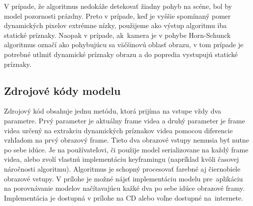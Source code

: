 V prípade, že algoritmus nedokáže detekovať žiadny pohyb na scéne, bol by model pozornosti prázdny.
Preto v prípade, keď je vyššie spomínaný pomer dynamických pixelov extrémne nízky, použijeme ako výstup algoritmu iba statické príznaky.
Naopak v prípade, ak~kamera je v pohybe Horn-Schunck algoritmus označí ako pohybujúcu sa väčšinovú oblasť obrazu, v tom prípade je potrebné utlmiť dynamické príznaky obrazu a do popredia vystupujú statické príznaky.

\clearpage

\subsection{Zdrojové kódy modelu}
Zdrojový kód obsahuje jednu metódu, ktorá prijíma na vstupe vždy dva parametre.
Prvý parameter je aktuálny frame videa a druhý parameter je frame videa určený na extrakciu dynamických príznakov videa pomocou diferencie vzhľadom na prvý obrazový frame.
Tieto dva obrazové vstupy nemusia byť nutne po sebe idúce.
Je na používateľovi, či použije model serializovane na každý frame videa, alebo zvolí vlastnú implementáciu keyframingu (napríklad kvôli časovej náročnosti algoritmu).
Algoritmus je schopný procesovať farebné aj čiernobiele obrazové vstupy.
V prílohe je možné nájsť implementáciu modelu pre~aplikáciu na porovnávanie modelov načítavajúcu kažké dva po sebe idúce obrazové framy.
Implementácia je dostupná v prílohe na CD alebo voľne dostupné na~internete.

